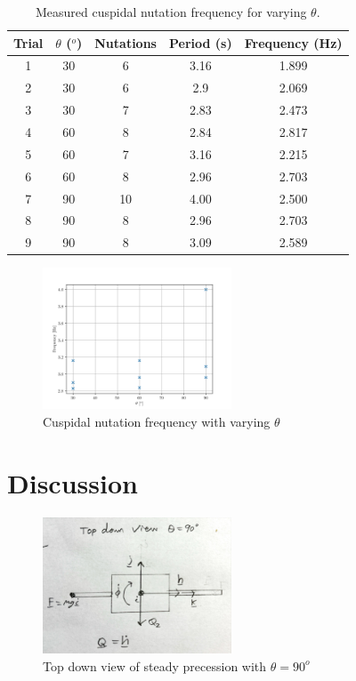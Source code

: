 \documentclass[8pt]{article}
\begin{document}
\begin{table}[H]
    \centering
    \begin{tabular}{|c|c|c|c|c|}
        \hline
        Trial & $\theta$ ($^o$) & Nutations  & Period (s) & Frequency (Hz)\\
        \hline
        1   & 30	& 6	    &   3.16	& 1.899 \\
        2   & 30    & 6	    &   2.9	    & 2.069 \\
        3   & 30    & 7	    &   2.83	& 2.473 \\
        4   & 60	& 8	    &   2.84	& 2.817 \\
        5   & 60    & 7	    &   3.16	& 2.215 \\
        6   & 60    & 8	    &   2.96	& 2.703 \\
        7   & 90	& 10    &   4.00	& 2.500 \\
        8   & 90    & 8	    &   2.96	& 2.703 \\
        9   & 90    & 8	    &   3.09	& 2.589 \\
        \hline
    \end{tabular}
    \caption{Measured cuspidal nutation frequency for varying $\theta$.}
    \label{tab:cuspidal_nutation}
\end{table}

\begin{figure}
    \centering
    \includegraphics[width=0.5\textwidth]{cuspidal_nutation.png}
    \caption{Cuspidal nutation frequency with varying $\theta$}
    \label{fig:cuspidal_nutation}
\end{figure}

\section{Discussion}

\begin{figure}[H]
    \centering
    \includegraphics[width=0.5\textwidth]{top_down_precession.jpg}
    \caption{Top down view of steady precession with $\theta = 90^o$}
    \label{fig:precession_vs_mass}
\end{figure}
\end{document}

